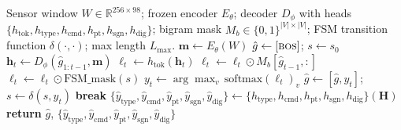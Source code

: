 \documentclass[sensors,article,submit,moreauthors,pdftex]{Definitions/mdpi}
\newcommand{\modelname}{G-Code Decoder}
\begin{document}
\begin{algorithm}[!htbp]
\let\item\olditem
\renewcommand{\baselinestretch}{1.0}\selectfont
\caption{Grammar-masked autoregressive forward pass for \modelname{}.}
\label{alg:forward}
\begin{algorithmic}[1]
\setlength{\itemsep}{0pt}
\Require Sensor window $W \in \mathbb{R}^{256 \times 98}$; frozen encoder $E_\theta$; decoder $D_\phi$ with heads $\{h_{\text{tok}}, h_{\text{type}}, h_{\text{cmd}}, h_{\text{pt}}, h_{\text{sgn}}, h_{\text{dig}}\}$; bigram mask $M_b \in \{0,1\}^{|V|\times|V|}$; FSM transition function $\delta(\cdot,\cdot)$; max length $L_{\max}$.
\Statex
\State $\mathbf{m} \gets E_\theta(W)$ 
\State $\hat{g} \gets [\textsc{bos}]$; $s \gets s_0$ 
  \State $\mathbf{h}_t \gets D_\phi(\hat{g}_{1:t-1}, \mathbf{m})$ 
  \State $\boldsymbol{\ell}_t \gets h_{\text{tok}}(\mathbf{h}_t)$ 
  \State $\boldsymbol{\ell}_t \gets \boldsymbol{\ell}_t \odot M_b[\hat{g}_{t-1}, :]$ 
  \State $\boldsymbol{\ell}_t \gets \boldsymbol{\ell}_t \odot \mathrm{FSM\_mask}(s)$ 
  \State $y_t \gets \arg\max_v \, \mathrm{softmax}(\boldsymbol{\ell}_t)_v$
  \State $\hat{g} \gets [\hat{g}, y_t]$; $s \gets \delta(s, y_t)$
   \textbf{break} \EndIf
\EndFor
\State $\{\hat{y}_{\text{type}}, \hat{y}_{\text{cmd}}, \hat{y}_{\text{pt}}, \hat{y}_{\text{sgn}}, \hat{y}_{\text{dig}}\} \gets \{h_{\text{type}}, h_{\text{cmd}}, h_{\text{pt}}, h_{\text{sgn}}, h_{\text{dig}}\}(\mathbf{H})$ 
\State \textbf{return} $\hat{g}$, $\{\hat{y}_{\text{type}}, \hat{y}_{\text{cmd}}, \hat{y}_{\text{pt}}, \hat{y}_{\text{sgn}}, \hat{y}_{\text{dig}}\}$
\end{algorithmic}
\end{algorithm}
\end{document}
